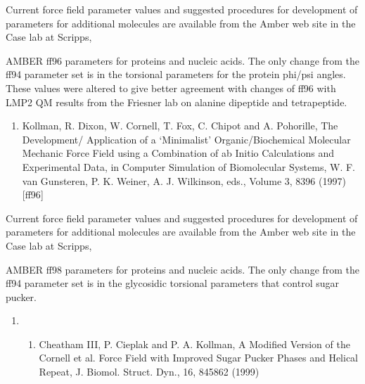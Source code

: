 \documentclass[letterpaper,11pt,english]{sphinxmanual}
\begin{document}
Current force field parameter values and suggested procedures for development of parameters for additional molecules are available from the Amber web site in the Case lab at Scripps, 


AMBER ff96 parameters for proteins and nucleic acids. The only change from the ff94 parameter set is in the torsional parameters for the protein phi/psi angles. These values were altered to give better agreement with  changes of ff96 with LMP2 QM results from the Friesner lab on alanine dipeptide and tetrapeptide.
\begin{enumerate}
%
\setcounter{enumi}{15}
\item {} 
Kollman, R. Dixon, W. Cornell, T. Fox, C. Chipot and A. Pohorille, The Development/ Application of a ‘Minimalist’ Organic/Biochemical Molecular Mechanic Force Field using a Combination of ab Initio Calculations and Experimental Data, in Computer Simulation of Biomolecular Systems, W. F. van Gunsteren, P. K. Weiner, A. J. Wilkinson, eds., Volume 3, 83\sphinxhyphen{}96 (1997)  {[}ff96{]}

\end{enumerate}

Current force field parameter values and suggested procedures for development of parameters for additional molecules are available from the Amber web site in the Case lab at Scripps, 


AMBER ff98 parameters for proteins and nucleic acids. The only change from the ff94 parameter set is in the glycosidic torsional parameters that control sugar pucker.
\begin{enumerate}
%
\setcounter{enumi}{19}
\item {} \begin{enumerate}
%
\setcounter{enumii}{4}
\item {} 
Cheatham III, P. Cieplak and P. A. Kollman, A Modified Version of the Cornell et al. Force Field with Improved Sugar Pucker Phases and Helical Repeat, J. Biomol. Struct. Dyn., 16, 845\sphinxhyphen{}862 (1999)

\end{enumerate}

\end{enumerate}
\end{document}
